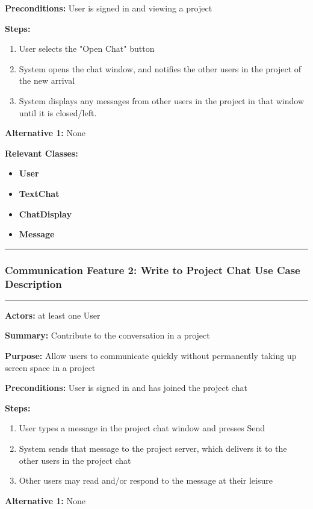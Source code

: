 \documentclass[twoside,letterpaper]{article}
\begin{document}
\noindent\textbf{Preconditions:} User is signed in and viewing a project \newline

\noindent\textbf{Steps:} \begin{enumerate}
	\item User selects the "Open Chat" button
	\item System opens the chat window, and notifies the other users in the project of the new arrival
	\item System displays any messages from other users in the project in that window until it is closed/left.
\end{enumerate}
\noindent\textbf{Alternative 1:} None \newline


\noindent\textbf{Relevant Classes:}
\begin{itemize}
	\item \textbf{User}
	\item \textbf{TextChat}
	\item \textbf{ChatDisplay}
	\item \textbf{Message}
\end{itemize}
\hrule
\newpage

\subsubsection[Communication Feature 2: Write to Project Chat Use Case Description]{\rmfamily\bfseries\color{black}
	Communication Feature 2: Write to Project Chat Use Case Description}
\hypertarget{RefHeading22059017292}{}

\vspace{2pt}
\hrule
\vspace{8pt}
\textbf{Actors:} at least one User \newline

\noindent\textbf{Summary:} Contribute to the conversation in a project  \newline

\noindent\textbf{Purpose:} Allow users to communicate quickly without permanently taking up screen space in a project \newline

\noindent\textbf{Preconditions:} User is signed in and has joined the project chat \newline

\noindent\textbf{Steps:} \begin{enumerate}
	\item User types a message in the project chat window and presses Send
	\item System sends that message to the project server, which delivers it to the other users in the project chat
	\item Other users may read and/or respond to the message at their leisure
\end{enumerate}
\noindent\textbf{Alternative 1:} None \newline
\end{document}
